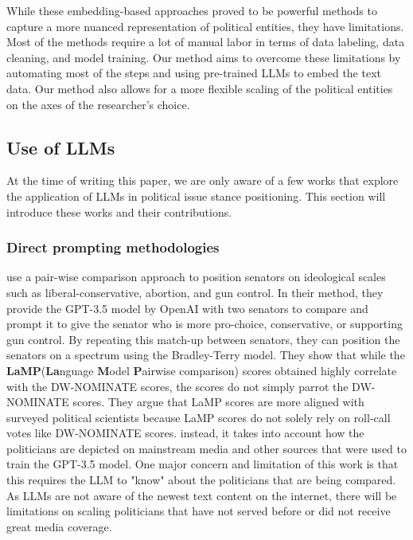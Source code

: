 \documentclass[final,5p,times,twocolumn,authoryear]{elsarticle}
\begin{document}
While these embedding-based approaches proved to be powerful methods to capture a more nuanced representation of political entities, they have limitations. Most of the methods require a lot of manual labor in terms of data labeling, data cleaning, and model training. Our method aims to overcome these limitations by automating most of the steps and using pre-trained LLMs to embed the text data. Our method also allows for a more flexible scaling of the political entities on the axes of the researcher's choice.

\subsection{Use of LLMs}
At the time of writing this paper, we are only aware of a few works that explore the application of LLMs in political issue stance positioning. This section will introduce these works and their contributions. 
\subsubsection{Direct prompting methodologies}
\citeauthor{llm-latent-position-of-politicians} use a pair-wise comparison approach to position senators on ideological scales such as liberal-conservative, abortion, and gun control. In their method, they provide the GPT-3.5 model by OpenAI with two senators to compare and prompt it to give the senator who is more pro-choice, conservative, or supporting gun control. By repeating this match-up between senators, they can position the senators on a spectrum using the Bradley-Terry model. They show that while the \textbf{LaMP}(\textbf{La}nguage \textbf{M}odel \textbf{P}airwise comparison) scores obtained highly correlate with the DW-NOMINATE scores, the scores do not simply parrot the DW-NOMINATE scores. They argue that LaMP scores are more aligned with surveyed political scientists because LaMP scores do not solely rely on roll-call votes like DW-NOMINATE scores. instead, it takes into account how the politicians are depicted on mainstream media and other sources that were used to train the GPT-3.5 model. One major concern and limitation of this work is that this requires the LLM to "know" about the politicians that are being compared. As LLMs are not aware of the newest text content on the internet, there will be limitations on scaling politicians that have not served before or did not receive great media coverage.
\end{document}
